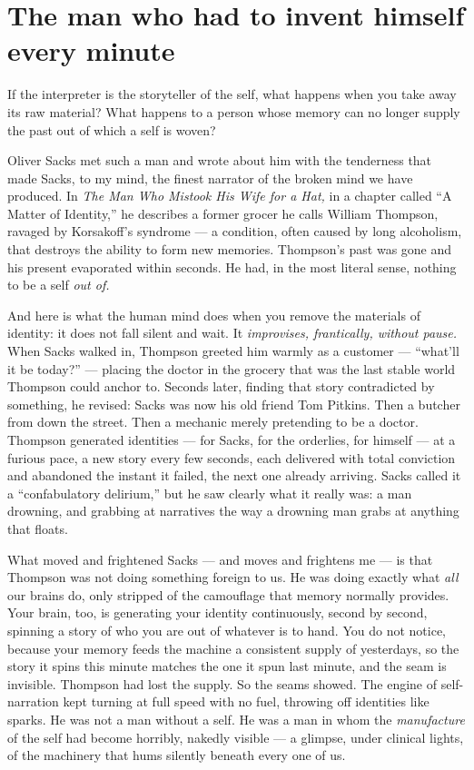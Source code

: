 \section*{The man who had to invent himself every minute}

If the interpreter is the storyteller of the self, what happens when you take away its raw material? What happens to a person whose memory can no longer supply the past out of which a self is woven?

Oliver Sacks met such a man and wrote about him with the tenderness that made Sacks, to my mind, the finest narrator of the broken mind we have produced. In \emph{The Man Who Mistook His Wife for a Hat,} in a chapter called ``A Matter of Identity,'' he describes a former grocer he calls William Thompson, ravaged by Korsakoff's syndrome — a condition, often caused by long alcoholism, that destroys the ability to form new memories. Thompson's past was gone and his present evaporated within seconds. He had, in the most literal sense, nothing to be a self \emph{out of.}

And here is what the human mind does when you remove the materials of identity: it does not fall silent and wait. It \emph{improvises, frantically, without pause.} When Sacks walked in, Thompson greeted him warmly as a customer — ``what'll it be today?'' — placing the doctor in the grocery that was the last stable world Thompson could anchor to. Seconds later, finding that story contradicted by something, he revised: Sacks was now his old friend Tom Pitkins. Then a butcher from down the street. Then a mechanic merely pretending to be a doctor. Thompson generated identities — for Sacks, for the orderlies, for himself — at a furious pace, a new story every few seconds, each delivered with total conviction and abandoned the instant it failed, the next one already arriving. Sacks called it a ``confabulatory delirium,'' but he saw clearly what it really was: a man drowning, and grabbing at narratives the way a drowning man grabs at anything that floats.

What moved and frightened Sacks — and moves and frightens me — is that Thompson was not doing something foreign to us. He was doing exactly what \emph{all} our brains do, only stripped of the camouflage that memory normally provides. Your brain, too, is generating your identity continuously, second by second, spinning a story of who you are out of whatever is to hand. You do not notice, because your memory feeds the machine a consistent supply of yesterdays, so the story it spins this minute matches the one it spun last minute, and the seam is invisible. Thompson had lost the supply. So the seams showed. The engine of self-narration kept turning at full speed with no fuel, throwing off identities like sparks. He was not a man without a self. He was a man in whom the \emph{manufacture} of the self had become horribly, nakedly visible — a glimpse, under clinical lights, of the machinery that hums silently beneath every one of us.

